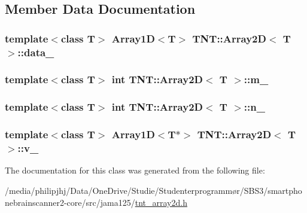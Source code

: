 \subsection{Member Data Documentation}
\hypertarget{classTNT_1_1Array2D_afb5d79a6c51d8d27121a982aaff4bc47}{
\subsubsection[{data\-\_\-}]{\setlength{\rightskip}{0pt plus 5cm}template$<$class T$>$ {\bf Array1\-D}$<$T$>$ {\bf T\-N\-T\-::\-Array2\-D}$<$ T $>$\-::data\-\_\-\hspace{0.3cm}{\ttfamily [protected]}}}\label{classTNT_1_1Array2D_afb5d79a6c51d8d27121a982aaff4bc47}
\hypertarget{classTNT_1_1Array2D_ad866fbd5cb16df751ebf9e4eea6f2f22}{
\subsubsection[{m\-\_\-}]{\setlength{\rightskip}{0pt plus 5cm}template$<$class T$>$ int {\bf T\-N\-T\-::\-Array2\-D}$<$ T $>$\-::m\-\_\-\hspace{0.3cm}{\ttfamily [protected]}}}\label{classTNT_1_1Array2D_ad866fbd5cb16df751ebf9e4eea6f2f22}
\hypertarget{classTNT_1_1Array2D_a4a182694802765bdb358f9737ab922b1}{
\subsubsection[{n\-\_\-}]{\setlength{\rightskip}{0pt plus 5cm}template$<$class T$>$ int {\bf T\-N\-T\-::\-Array2\-D}$<$ T $>$\-::n\-\_\-\hspace{0.3cm}{\ttfamily [protected]}}}\label{classTNT_1_1Array2D_a4a182694802765bdb358f9737ab922b1}
\hypertarget{classTNT_1_1Array2D_ad270c8e9b65bb9ae37fcf05797b17cbf}{
\subsubsection[{v\-\_\-}]{\setlength{\rightskip}{0pt plus 5cm}template$<$class T$>$ {\bf Array1\-D}$<$T$\ast$$>$ {\bf T\-N\-T\-::\-Array2\-D}$<$ T $>$\-::v\-\_\-\hspace{0.3cm}{\ttfamily [protected]}}}\label{classTNT_1_1Array2D_ad270c8e9b65bb9ae37fcf05797b17cbf}


The documentation for this class was generated from the following file\-:\begin{DoxyCompactItemize}
\item 
/media/philipjhj/\-Data/\-One\-Drive/\-Studie/\-Studenterprogrammør/\-S\-B\-S3/smartphonebrainscanner2-\/core/src/jama125/\hyperlink{tnt__array2d_8h}{tnt\-\_\-array2d.\-h}\end{DoxyCompactItemize}
